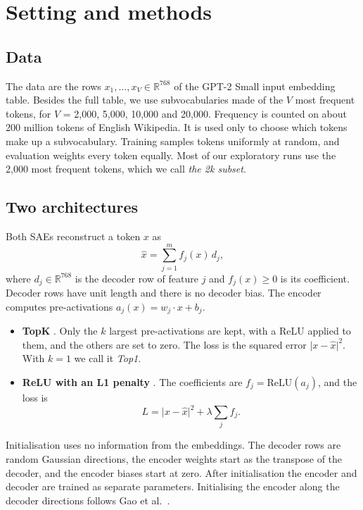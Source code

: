\documentclass[11pt]{article}
\newcommand{\norm}[1]{\lvert #1\rvert}
\begin{document}
\section{Setting and methods}
\label{sec:setting}

\subsection{Data}

The data are the rows $x_1, \dots, x_V \in \mathbb{R}^{768}$ of the GPT-2 Small input embedding table. Besides the full table, we use subvocabularies made of the $V$ most frequent tokens, for $V$ = 2,000, 5,000, 10,000 and 20,000. Frequency is counted on about 200 million tokens of English Wikipedia. It is used only to choose which tokens make up a subvocabulary. Training samples tokens uniformly at random, and evaluation weights every token equally. Most of our exploratory runs use the 2,000 most frequent tokens, which we call \emph{the 2k subset}.

\subsection{Two architectures}

Both SAEs reconstruct a token $x$ as
\begin{equation}
\hat{x} = \sum_{j=1}^{m} f_j(x)\, d_j ,
\end{equation}
where $d_j \in \mathbb{R}^{768}$ is the decoder row of feature $j$ and $f_j(x) \ge 0$ is its coefficient. Decoder rows have unit length and there is no decoder bias. The encoder computes pre-activations $a_j(x) = w_j \cdot x + b_j$.
\begin{itemize}[leftmargin=*]
\item \textbf{TopK} \cite{makhzani2013ksparse,gao2024scaling}. Only the $k$ largest pre-activations are kept, with a ReLU applied to them, and the others are set to zero. The loss is the squared error $\norm{x - \hat{x}}^2$. With $k = 1$ we call it \emph{Top1}.
\item \textbf{ReLU with an L1 penalty} \cite{bricken2023monosemanticity,cunningham2023sparse}. The coefficients are $f_j = \mathrm{ReLU}(a_j)$, and the loss is
\begin{equation}
L = \norm{x - \hat{x}}^2 + \lambda \sum_j f_j .
\end{equation}
\end{itemize}
Initialisation uses no information from the embeddings. The decoder rows are random Gaussian directions, the encoder weights start as the transpose of the decoder, and the encoder biases start at zero. After initialisation the encoder and decoder are trained as separate parameters. Initialising the encoder along the decoder directions follows Gao et al.~\cite{gao2024scaling}.
\end{document}
